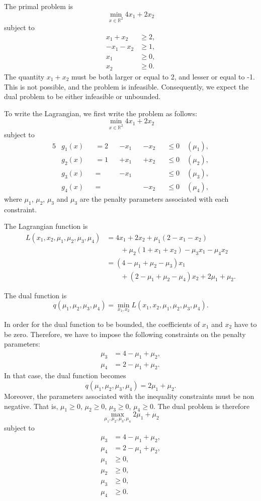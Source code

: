
The primal problem is
\[
\min_{x \in \mathbb{R}^2} 4x_1+2x_2
\]
subject to 
\begin{align*}
x_1+x_2 & \geq 2,\\
-x_1-x_2 & \geq 1,\\
x_1 & \geq 0,\\
x_2 & \geq 0.
\end{align*}
The quantity $x_1+x_2$ must be both larger or equal to 2, and lesser
or equal to -1. This is not possible, and the problem is
infeasible. Consequently, we expect the dual problem to be either
infeasible or unbounded.

  To write the Lagrangian, we first write the problem as follows:
$$\min_{x \in \mathbb{R}^2} 4x_1+2x_2$$ 
subject to 
\begin{alignat*}{5}
& g_1(x) && = 2 && -x_1 && -x_2 && \leq 0 \quad (\mu_1),\\
& g_2(x) &&= 1 && +x_1 && +x_2 && \leq 0 \quad (\mu_2),\\
& g_3(x) &&= && -x_1 && && \leq 0 \quad (\mu_3),\\
& g_4(x) &&= && && -x_2 && \leq 0 \quad (\mu_4),
\end{alignat*}
where $\mu_1$, $\mu_2$, $\mu_3$ and $\mu_3$ are the penalty parameters
associated with each constraint.

The Lagrangian function is 
\begin{align*}
L(x_1,x_2,\mu_1,\mu_2,\mu_3,\mu_4) & = 4x_1+2x_2 + \mu_1(2-x_1-x_2) \\
& \qquad + \mu_2(1 +x_1+x_2) - \mu_3 x_1 - \mu_4 x_2\\
& = (4-\mu_1+\mu_2-\mu_3)x_1\\ & \qquad + (2-\mu_1+\mu_2-\mu_4)x_2 + 2\mu_1 + \mu_2.
\end{align*}

The dual function is
\[
q(\mu_1,\mu_2,\mu_3,\mu_4) = \min_{x_1,x_2} L(x_1,x_2,\mu_1,\mu_2,\mu_3,\mu_4).
\]

In order for the dual function to be bounded, the coefficients of
$x_1$ and $x_2$ have to be zero.  Therefore, we have to impose the
following constraints on the penalty parameters:
\begin{align}
  \mu_3&=4-\mu_1+\mu_2, \label{eq:5} \\
  \mu_4&=2-\mu_1+\mu_2. \label{eq:6}
\end{align}
In that case, the dual function becomes 
\[
q(\mu_1,\mu_2,\mu_3,\mu_4) = 2\mu_1 + \mu_2.
\]
Moreover, the parameters associated with the inequality constraints
must be non negative. That is, $\mu_1 \geq 0$, $\mu_2 \geq
0$, $\mu_3 \geq 0$, $\mu_4 \geq 0$. The dual problem is therefore
\[
\max_{\mu_1,\mu_2,\mu_3,\mu_4}2\mu_1 + \mu_2
\]
subject to
\begin{align*}
  \mu_3&=4-\mu_1+\mu_2,\\
  \mu_4&=2-\mu_1+\mu_2, \\
  \mu_1 & \geq 0, \\
  \mu_2 & \geq 0, \\
  \mu_3 & \geq 0, \\
  \mu_4 & \geq 0.
\end{align*}

